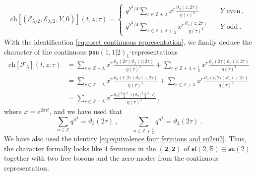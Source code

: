 \documentclass[12pt,a4paper]{article}
\newcommand{\be}{\begin{equation}}
\newcommand{\ee}{\end{equation}}
\begin{document}
\begin{align} 
\mathrm{ch}[(\mathscr{E}_{\lambda/2},\mathscr{E}_{\lambda/2},Y,0)](t,z;\tau)=\begin{cases} q^{Y^2/4}\sum_{r \in \mathds{Z}+\lambda} x^r \frac{\vartheta_2(z,2\tau)}{\eta(\tau)^4} \quad & Y\text{ even}\ ,\\
q^{Y^2/4}\sum_{r \in \mathds{Z}+\lambda+\frac{1}{2}} x^r \frac{\vartheta_3(z,2\tau)}{\eta(\tau)^4} \quad & Y\text{ odd}\ .
\end{cases}
\end{align}
With the identification \eqref{eq:coset continuous representation}, we finally deduce the character of the continuous $\mathfrak{psu}(1,1|2)_1$-representations
\begin{align} 
\mathrm{ch}[\mathscr{F}_\lambda](t,z;\tau)&=\sum_{r \in \mathds{Z}+\lambda} x^r \frac{\vartheta_3(2\tau)\vartheta_2(z;2\tau)}{\eta(\tau)^4}+\sum_{r \in \mathds{Z}+\lambda+\frac{1}{2}} x^r \frac{\vartheta_2(2\tau)\vartheta_3(z;2\tau)}{\eta(\tau)^4}\\
&=\sum_{r \in \mathds{Z}+\lambda} x^r \frac{\vartheta_3(t;2\tau)\vartheta_2(z;2\tau)}{\eta(\tau)^4}+\sum_{r \in \mathds{Z}+\lambda} x^r \frac{\vartheta_2(t;2\tau)\vartheta_3(z;2\tau)}{\eta(\tau)^4} \\
&=\sum_{r \in \mathds{Z}+\lambda} x^r  \frac{\vartheta_2\big(\frac{t+z}{2};\tau\big)\vartheta_2\big(\frac{t-z}{2};\tau\big)}{\eta(\tau)^4}\ ,
\end{align}
where $x=\mathrm{e}^{2\pi i t}$, and we have used that
\be
\sum_{n\in\mathds{Z}} q^{n^2} = \vartheta_3(2\tau) \ , \qquad
\sum_{n\in\mathds{Z}+\frac{1}{2}} q^{n^2} = \vartheta_2(2\tau) \ .
\ee
We have also used the identity \eqref{eq:equivalence four fermions and su2su2}.
Thus, the character formally looks like 4 fermions in the $(\mathbf{2},\mathbf{2})$ of $\mathfrak{sl}(2,\mathds{R}) \oplus \mathfrak{su}(2)$ together with two free bosons and the zero-modes from the continuous representation. 
\end{document}
